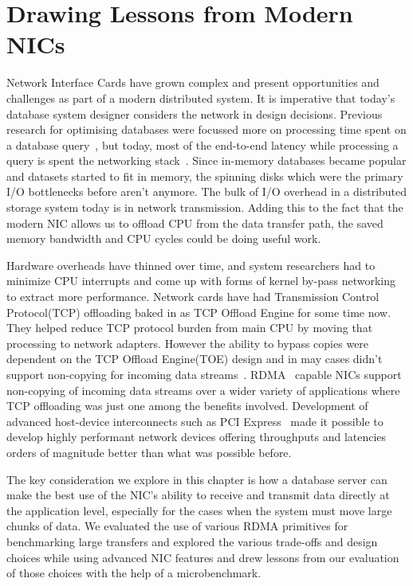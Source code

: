 \chapter{Drawing Lessons from Modern NICs}
\label{chap:modernnics}
Network Interface Cards have grown complex and present opportunities and challenges as part of a modern distributed system.
 It is imperative that today’s database system designer considers the network in design decisions.
 Previous research for optimising databases were focussed more on processing time spent on a database query~\cite{dbmsproctime},
  but today, most of the end-to-end latency while processing a query is spent the networking stack~\cite{ramcloudosr}.
Since in-memory databases became popular and datasets started to fit in memory, the spinning disks 
which were the primary I/O bottlenecks before aren't anymore. The bulk of I/O overhead in a distributed storage system today is in network transmission.
Adding this to the fact that the modern NIC allows us to offload CPU from the data transfer path,
the saved memory bandwidth and CPU cycles could be doing useful work.

Hardware overheads have thinned over time, and system researchers had to minimize CPU interrupts and come up with forms of kernel by-pass networking to extract more performance.
 Network cards have had Transmission Control Protocol(TCP) offloading baked in as TCP Offload Engine for some time now. They helped reduce TCP protocol burden from main CPU by moving that processing to network adapters.
 However the ability to bypass copies were dependent on the TCP Offload Engine(TOE) design and in may cases didn't support non-copying for incoming data streams~\cite{tcpoffload}. 
 RDMA~\cite{rdmapatent,rdmacase,rdma} capable NICs support non-copying of incoming data streams over a wider variety of applications where TCP offloading was just one among the benefits involved.
 Development of advanced host-device interconnects such as PCI Express~\cite{pcie}  made it possible to develop highly performant network devices offering throughputs and latencies orders of magnitude better than what was possible before.

 The key consideration we explore in this chapter is how a database server can make the best use of the NIC’s ability to receive and transmit data directly at the application level, especially for the
cases when the system must move large chunks of data. We evaluated
the use of various RDMA primitives for benchmarking large transfers and explored the various
 trade-offs and design choices while using advanced NIC features and drew lessons from our evaluation of those choices with the help of a microbenchmark. 

